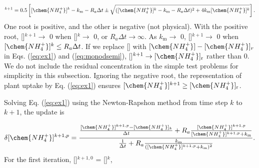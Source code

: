 \documentclass[gmd, manuscript]{copernicus}
\begin{document}
\begin{equation}
[\chem{NH_4^+}]^{k+1}=0.5 \left[[\chem{NH_4^+}]^k - k_\text{m} - R_a \Delta t
\pm \sqrt{([\chem{NH_4^+}]^k - k_\text{m} - R_a\Delta t)^2 + 4
k_\text{m}[\chem{NH_4^+}]^k}\right].
\label{eq:monodsemi}
\end{equation}
One root is positive, and the other is negative (not physical). With the
positive root, []$^{k+1}\rightarrow$ 0 when []$^k
\rightarrow$ 0, or $R_a\Delta t \rightarrow \infty$. As $k_\text{m}\rightarrow$
0, []$^{k+1}\rightarrow$ 0 when $[\chem{NH_4^+}]^k \leq R_a \Delta
t$. If we replace [] with $[\chem{NH_4^+}]-[\chem{NH_4^+}]_r$ in
Eqs. (\ref{eq:ex1}) and (\ref{eq:monodsemi}), []$^{k+1} \rightarrow
[\chem{NH_4^+}]_\text{r}$ rather than 0. We do not include the
residual concentration in the simple test problems for simplicity in this
subsection. Ignoring the negative root, the representation of
plant  uptake by Eq. (\ref{eq:ex1}) ensures $[\chem{NH_4^+}]^{k+1}
\geq [\chem{NH_4^+}]_\text{r}$. 

Solving Eq. (\ref{eq:ex1}) using the Newton-Rapshon method from time step $k$
to $k+1$, the update is 

\begin{equation}
\delta [\chem{NH_4^+}]^{k+1,p} =
\frac{\frac{[\chem{NH_4^+}]^{k+1,p}-[\chem{NH_4^+}]_k} {\Delta t}+R_a
\frac{[\chem{NH_4^+}]^{k+1,p}}{[\chem{NH_4^+}]^{k+1,p}+k_\text{m}}}{\frac{1}{\Delta
t} + R_a \frac{k_\text{m}}{([\chem{NH_4^+}]^{k+1,p}+k_\text{m})^2}}.
\end{equation}
For the first iteration, []$^{k+1,0}$ = []$^k$, 
\end{document}
